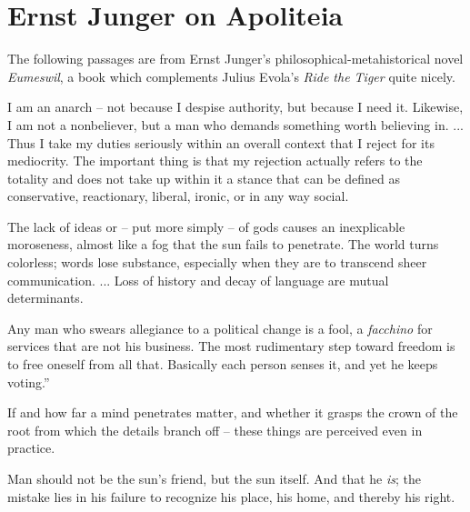 \section{Ernst Junger on Apoliteia}

The following passages are from Ernst Junger's philosophical-metahistorical novel \emph{Eumeswil}, a book which complements Julius Evola's \emph{Ride the Tiger} quite nicely.

\begin{quotex}
I am an anarch -- not because I despise authority, but because I need it. Likewise, I am not a nonbeliever, but a man who demands something worth believing in. ... Thus I take my duties seriously within an overall context that I reject for its mediocrity. The important thing is that my rejection actually refers to the totality and does not take up within it a stance that can be defined as conservative, reactionary, liberal, ironic, or in any way social.
\end{quotex}


\begin{quotex}
The lack of ideas or -- put more simply -- of gods causes an inexplicable moroseness, almost like a fog that the sun fails to penetrate. The world turns colorless; words lose substance, especially when they are to transcend sheer communication. ... Loss of history and decay of language are mutual determinants.
\end{quotex}


\begin{quotex}
Any man who swears allegiance to a political change is a fool, a \emph{facchino} for services that are not his business. The most rudimentary step toward freedom is to free oneself from all that. Basically each person senses it, and yet he keeps voting.''
\end{quotex}


\begin{quotex}
If and how far a mind penetrates matter, and whether it grasps the crown of the root from which the details branch off -- these things are perceived even in practice.
\end{quotex}


\begin{quotex}
Man should not be the sun's friend, but the sun itself. And that he \emph{is}; the mistake lies in his failure to recognize his place, his home, and thereby his right.
\end{quotex}



